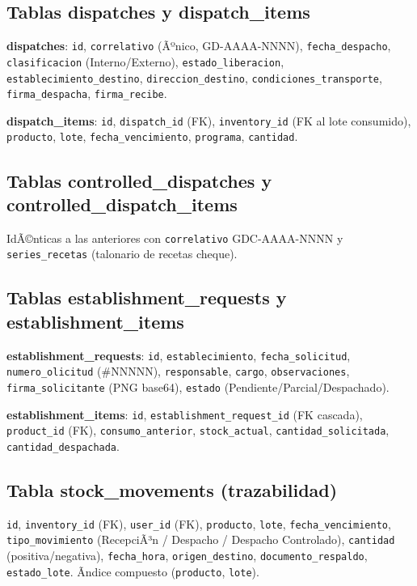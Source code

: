 ﻿\documentclass[a4paper, 12pt]{article}
\begin{document}
\subsection{Tablas dispatches y dispatch\_items}
\textbf{dispatches}: \texttt{id}, \texttt{correlativo} (Ãºnico, GD-AAAA-NNNN), \texttt{fecha\_despacho}, \texttt{clasificacion} (Interno/Externo), \texttt{estado\_liberacion}, \texttt{establecimiento\_destino}, \texttt{direccion\_destino}, \texttt{condiciones\_transporte}, \texttt{firma\_despacha}, \texttt{firma\_recibe}.

\textbf{dispatch\_items}: \texttt{id}, \texttt{dispatch\_id} (FK), \texttt{inventory\_id} (FK al lote consumido), \texttt{producto}, \texttt{lote}, \texttt{fecha\_vencimiento}, \texttt{programa}, \texttt{cantidad}.

\subsection{Tablas controlled\_dispatches y controlled\_dispatch\_items}
IdÃ©nticas a las anteriores con \texttt{correlativo} GDC-AAAA-NNNN y \texttt{series\_recetas} (talonario de recetas cheque).

\subsection{Tablas establishment\_requests y establishment\_items}
\textbf{establishment\_requests}: \texttt{id}, \texttt{establecimiento}, \texttt{fecha\_solicitud}, \texttt{numero\_olicitud} (\#NNNNN), \texttt{responsable}, \texttt{cargo}, \texttt{observaciones}, \texttt{firma\_solicitante} (PNG base64), \texttt{estado} (Pendiente/Parcial/Despachado).

\textbf{establishment\_items}: \texttt{id}, \texttt{establishment\_request\_id} (FK cascada), \texttt{product\_id} (FK), \texttt{consumo\_anterior}, \texttt{stock\_actual}, \texttt{cantidad\_solicitada}, \texttt{cantidad\_despachada}.

\subsection{Tabla stock\_movements (trazabilidad)}
\texttt{id}, \texttt{inventory\_id} (FK), \texttt{user\_id} (FK), \texttt{producto}, \texttt{lote}, \texttt{fecha\_vencimiento}, \texttt{tipo\_movimiento} (RecepciÃ³n / Despacho / Despacho Controlado), \texttt{cantidad} (positiva/negativa), \texttt{fecha\_hora}, \texttt{origen\_destino}, \texttt{documento\_respaldo}, \texttt{estado\_lote}. Ãndice compuesto (\texttt{producto}, \texttt{lote}).
\end{document}

